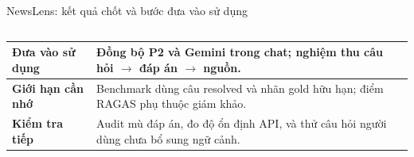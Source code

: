 \begin{frame}[t]{NewsLens: kết quả chốt và bước đưa vào sử dụng}
\begin{columns}[T,onlytextwidth]
\begin{column}{.31\textwidth}\end{column}
\begin{column}{.31\textwidth}\end{column}
\begin{column}{.31\textwidth}\end{column}
\end{columns}
\vspace{4mm}
{\tabletext\begin{tabularx}{\textwidth}{@{}p{48mm}L@{}}
\textbf{Đưa vào sử dụng} & Đồng bộ P2 và Gemini trong chat; nghiệm thu câu hỏi $\rightarrow$ đáp án $\rightarrow$ nguồn. \\\midrule
\textbf{Giới hạn cần nhớ} & Benchmark dùng câu resolved và nhãn gold hữu hạn; điểm RAGAS phụ thuộc giám khảo. \\\midrule
\textbf{Kiểm tra tiếp} & Audit mù đáp án, đo độ ổn định API, và thử câu hỏi người dùng chưa bổ sung ngữ cảnh. \\\bottomrule
\end{tabularx}\par}
\end{frame}
